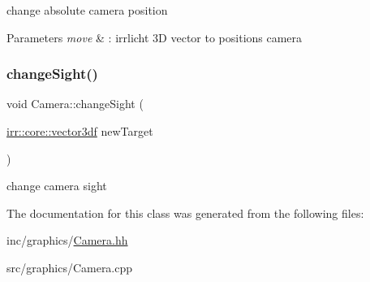 change absolute camera position 


\begin{DoxyParams}{Parameters}
{\em move} & \+: irrlicht 3D vector to positions camera \\
\hline
\end{DoxyParams}
\mbox{\label{classCamera_a8c11f289be05671191a4f91288155685}} 
\subsubsection{\texorpdfstring{change\+Sight()}{changeSight()}}
{\footnotesize\ttfamily void Camera\+::change\+Sight (\begin{DoxyParamCaption}\item[{\hyperlink{namespaceirr_1_1core_ae6e2b2a6c552833ebbd5b7463d03586b}{irr\+::core\+::vector3df}}]{new\+Target }\end{DoxyParamCaption})}



change camera sight 



The documentation for this class was generated from the following files\+:\begin{DoxyCompactItemize}
\item 
inc/graphics/\hyperlink{Camera_8hh}{Camera.\+hh}\item 
src/graphics/Camera.\+cpp\end{DoxyCompactItemize}
